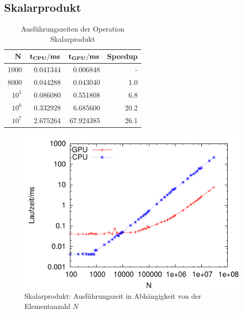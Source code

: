 \documentclass[journal]{IEEEtran}
\begin{document}


\subsection{Skalarprodukt}


\begin{table}[h]
\renewcommand{\arraystretch}{1.3}
\caption{Ausführungszeiten der Operation Skalarprodukt}
\label{valuesdotmul}
\centering
\begin{tabular}{|r||r|r|r|}
\hline
\bfseries $ \bf N$ & \bfseries{ $ \bf t_{CPU} / ms $ } &  $ \bf t_{GPU} / ms$ & \bfseries{Speedup} \\
\hline\hline


1000   &  0.041344 & 0.006848 & - \\
8000  &  0.044288 & 0.043040     &    1.0 \\
$ 10^5 $ &  0.086080 & 0.551808    &   6.8 \\
$ 10^6 $ & 0.332928 & 6.685600    &   20.2 \\
$ 10^7 $ & 2.675264 & 67.924385  & 26.1 \\

\hline
\end{tabular}
\end{table}




\begin{figure}[htbp]

   \includegraphics{dotmul/d/dotmul.pdf}

   \caption{ \label{dotmul} Skalarprodukt: Ausführungszeit in Abhängigkeit von der Elementanzahl $N$}%

\end{figure}
\end{document}
